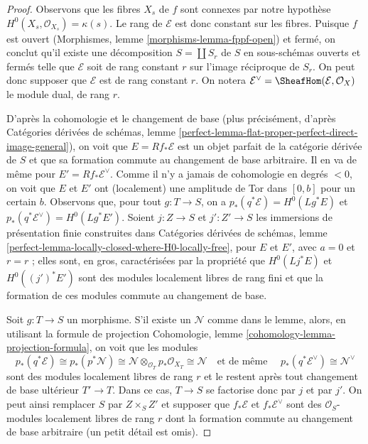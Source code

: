 \begin{proof}
Observons que les fibres $X_s$ de $f$ sont connexes par notre hypothèse
$H^0(X_s, \mathcal{O}_{X_s}) = \kappa(s)$. Le rang de
$\mathcal{E}$ est donc constant sur les fibres. Puisque $f$ est ouvert
(Morphismes, lemme \ref{morphisms-lemma-fppf-open}) et fermé,
on conclut qu'il existe une décomposition $S = \coprod S_r$
de $S$ en sous-schémas ouverts et fermés telle que $\mathcal{E}$
soit de rang constant $r$ sur l'image réciproque de $S_r$.
On peut donc supposer que $\mathcal{E}$ est de rang constant $r$.
On notera $\mathcal{E}^\vee = \SheafHom(\mathcal{E}, \mathcal{O}_X)$
le module dual, de rang $r$.

\medskip\noindent
D'après la cohomologie et le changement de base (plus précisément, d'après
Catégories dérivées de schémas, lemme
\ref{perfect-lemma-flat-proper-perfect-direct-image-general}),
on voit que $E = Rf_*\mathcal{E}$ est un objet parfait de la
catégorie dérivée de $S$ et que sa formation commute au
changement de base arbitraire. Il en va de même pour $E' = Rf_*\mathcal{E}^\vee$.
Comme il n'y a jamais de cohomologie en degrés $< 0$, on voit que
$E$ et $E'$ ont (localement) une amplitude de Tor dans $[0, b]$ pour un certain $b$.
Observons que, pour tout $g : T \to S$, on a
$p_*(q^*\mathcal{E}) = H^0(Lg^*E)$ et
$p_*(q^*\mathcal{E}^\vee) = H^0(Lg^*E')$.
Soient $j : Z \to S$ et $j' : Z' \to S$ les immersions
de présentation finie construites dans Catégories dérivées de schémas, lemme
\ref{perfect-lemma-locally-closed-where-H0-locally-free},
pour $E$ et $E'$, avec $a = 0$ et $r = r$ ; elles sont, en gros,
caractérisées par la propriété que $H^0(Lj^*E)$ et $H^0((j')^*E')$
sont des modules localement libres de rang fini et que la formation de ces modules commute au changement de base.

\medskip\noindent
Soit $g : T \to S$ un morphisme. S'il existe un $\mathcal{N}$
comme dans le lemme, alors, en utilisant la formule de projection
Cohomologie, lemme \ref{cohomology-lemma-projection-formula},
on voit que les modules
$$
p_*(q^*\mathcal{E}) \cong
p_*(p^*\mathcal{N}) \cong
\mathcal{N} \otimes_{\mathcal{O}_T} p_*\mathcal{O}_{X_T} \cong
\mathcal{N}\quad\text{et de même }\quad
p_*(q^*\mathcal{E}^\vee) \cong \mathcal{N}^\vee
$$
sont des modules localement libres de rang $r$
et le restent après tout changement de base ultérieur $T' \to T$.
Dans ce cas, $T \to S$ se factorise donc par $j$ et par $j'$.
On peut ainsi remplacer $S$ par $Z \times_S Z'$ et supposer que
$f_*\mathcal{E}$ et $f_*\mathcal{E}^\vee$ sont des
$\mathcal{O}_S$-modules localement libres de rang $r$
dont la formation commute au changement de base arbitraire
(un petit détail est omis).


\end{proof}
